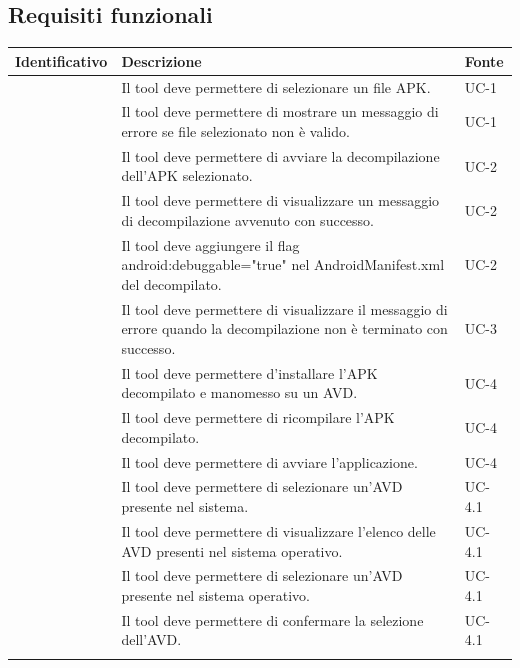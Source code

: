 \subsection{Requisiti funzionali}\label{subsec:requisiti-funzionali}
\renewcommand{\arraystretch}{1.5}
\begin{center}
    \begin{longtable}{ | c| C{7cm} |C{3cm} |}
        \hline
        \textbf{Identificativo} & \textbf{Descrizione} &\textbf{Fonte}\\\hline
         & Il tool deve permettere di selezionare un file APK.& UC-1\\\hline
         & Il tool deve permettere di mostrare un messaggio di errore se file selezionato non è valido. & UC-1\\\hline
        \setcounter{subCount}{0}

         & Il tool deve permettere di avviare la decompilazione dell'APK selezionato.& UC-2\\\hline
         & Il tool deve permettere di visualizzare un messaggio di decompilazione avvenuto con successo. & UC-2\\\hline
         & Il tool deve aggiungere il flag android:debuggable="true" nel AndroidManifest.xml del decompilato. & UC-2\\\hline
        \setcounter{subCount}{0}

         & Il tool deve permettere di visualizzare il messaggio di errore quando la decompilazione non è terminato con successo.& UC-3\\\hline
         & Il tool deve permettere d'installare l'APK decompilato e manomesso su un AVD. & UC-4 \\\hline
         & Il tool deve permettere di ricompilare l'APK decompilato.& UC-4\\\hline
         & Il tool deve permettere di avviare l'applicazione.& UC-4\\\hline
        \setcounter{subCount}{0}

         & Il tool deve permettere di selezionare un'AVD presente nel sistema.& UC-4.1 \\\hline
         & Il tool deve permettere di visualizzare l'elenco delle AVD presenti nel sistema operativo.& UC-4.1\\\hline
         & Il tool deve permettere di selezionare un'AVD presente nel sistema operativo.& UC-4.1\\\hline
         & Il tool deve permettere di confermare la selezione dell'AVD.& UC-4.1\\\hline
        \setcounter{subCount}{0}


\end{longtable}
\end{center}

